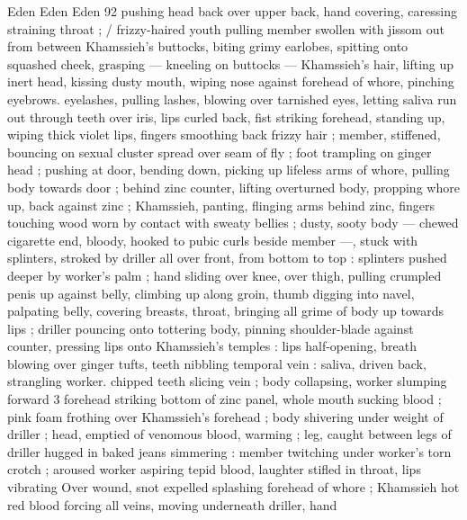 Eden Eden Eden 92
pushing head back over upper back, hand covering, caressing
straining throat ; / frizzy-haired youth pulling member swollen with
jissom out from between Khamssieh's buttocks, biting grimy
earlobes, spitting onto squashed cheek, grasping — kneeling on
buttocks — Khamssieh's hair, lifting up inert head, kissing dusty
mouth, wiping nose against forehead of whore, pinching eyebrows.
eyelashes, pulling lashes, blowing over tarnished eyes, letting saliva
run out through teeth over iris, lips curled back, fist striking
forehead, standing up, wiping thick violet lips, fingers smoothing
back frizzy hair ; member, stiffened, bouncing on sexual cluster
spread over seam of fly ; foot trampling on ginger head ; pushing at
door, bending down, picking up lifeless arms of whore, pulling body
towards door ; behind zinc counter, lifting overturned body, propping
whore up, back against zinc ; Khamssieh, panting, flinging arms
behind zinc, fingers touching wood worn by contact with sweaty
bellies ; dusty, sooty body — chewed cigarette end, bloody, hooked
to pubic curls beside member —, stuck with splinters, stroked by
driller all over front, from bottom to top : splinters pushed deeper by
worker's palm ; hand sliding over knee, over thigh, pulling crumpled
penis up against belly, climbing up along groin, thumb digging into
navel, palpating belly, covering breasts, throat, bringing all grime of
body up towards lips ; driller pouncing onto tottering body, pinning
shoulder-blade against counter, pressing lips onto Khamssieh’s
temples : lips half-opening, breath blowing over ginger tufts, teeth
nibbling temporal vein : saliva, driven back, strangling worker.
chipped teeth slicing vein ; body collapsing, worker slumping forward
3 forehead striking bottom of zinc panel, whole mouth sucking blood
; pink foam frothing over Khamssieh’s forehead ; body shivering
under weight of driller ; head, emptied of venomous blood, warming
; leg, caught between legs of driller hugged in baked jeans
simmering : member twitching under worker's torn crotch ; aroused
worker aspiring tepid blood, laughter stifled in throat, lips vibrating
Over wound, snot expelled splashing forehead of whore ; Khamssieh
hot red blood forcing all veins, moving underneath driller, hand

